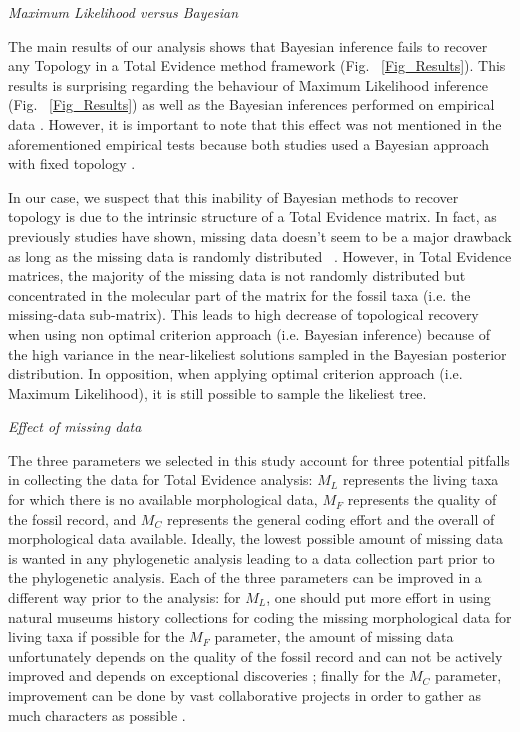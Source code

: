 \documentclass[12pt,letterpaper]{article}
\renewcommand{\subsection}[1]{%
\bigskip
\begin{center}
\begin{large}
\normalfont\itshape #1
\end{large}
\end{center}}
\begin{document}
\subsection{Maximum Likelihood versus Bayesian}
The main results of our analysis shows that Bayesian inference fails to recover any Topology in a Total Evidence method framework (Fig. ~\ref{Fig_Results}).
This results is surprising regarding the behaviour of Maximum Likelihood inference (Fig. ~\ref{Fig_Results}) as well as the Bayesian inferences performed on empirical data \citep{ronquista2012,schragocombining2013}.
However, it is important to note that this effect was not mentioned in the aforementioned empirical tests because both studies used a Bayesian approach with fixed topology \citep{ronquista2012,schragocombining2013}.

In our case, we suspect that this inability of Bayesian methods to recover topology is due to the intrinsic structure of a Total Evidence matrix.
In fact, as previously studies have shown, missing data doesn't seem to be a major drawback as long as the missing data is randomly distributed ~\citep[e.g.][]{wiensmissing2003,rouresite-specific2011,sansomfossilization2013}.
However, in Total Evidence matrices, the majority of the missing data is not randomly distributed but concentrated in the molecular part of the matrix for the fossil taxa (i.e. the missing-data sub-matrix).
This leads to high decrease of topological recovery when using non optimal criterion approach (i.e. Bayesian inference) because of the high variance in the near-likeliest solutions sampled in the Bayesian posterior distribution.
In opposition, when applying optimal criterion approach (i.e. Maximum Likelihood), it is still possible to sample the likeliest tree. %

\subsection{Effect of missing data}
The three parameters we selected in this study account for three potential pitfalls in collecting the data for Total Evidence analysis:
$M_L$ represents the living taxa for which there is no available morphological data,
$M_F$ represents the quality of the fossil record,
and $M_C$ represents the general coding effort and the overall of morphological data available.
Ideally, the lowest possible amount of missing data is wanted in any phylogenetic analysis leading to a data collection part prior to the phylogenetic analysis.
Each of the three parameters can be improved in a different way prior to the analysis:
for $M_L$, one should put more effort in using natural museums history collections for coding the missing morphological data for living taxa if possible %
for the $M_F$ parameter, the amount of missing data unfortunately depends on the quality of the fossil record and can not be actively improved and depends on exceptional discoveries \citep[e.g.][]{nithe2013};
finally for the $M_C$ parameter, improvement can be done by vast collaborative projects in order to gather as much characters as possible \citep[e.g.][]{O'Leary08022013}.
\end{document}
